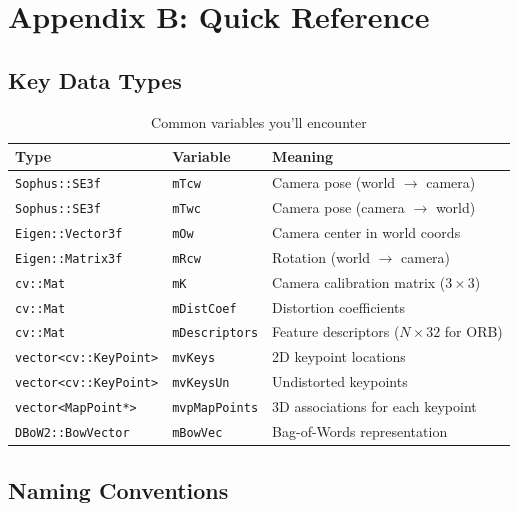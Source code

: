 \section{Appendix B: Quick Reference}

\subsection{Key Data Types}

\begin{table}[H]
\centering
\begin{tabular}{@{}llp{7cm}@{}}
\toprule
\textbf{Type} & \textbf{Variable} & \textbf{Meaning} \\
\midrule
\texttt{Sophus::SE3f} & \texttt{mTcw} & Camera pose (world $\to$ camera) \\
\texttt{Sophus::SE3f} & \texttt{mTwc} & Camera pose (camera $\to$ world) \\
\texttt{Eigen::Vector3f} & \texttt{mOw} & Camera center in world coords \\
\texttt{Eigen::Matrix3f} & \texttt{mRcw} & Rotation (world $\to$ camera) \\
\texttt{cv::Mat} & \texttt{mK} & Camera calibration matrix ($3\times3$) \\
\texttt{cv::Mat} & \texttt{mDistCoef} & Distortion coefficients \\
\texttt{cv::Mat} & \texttt{mDescriptors} & Feature descriptors ($N\times32$ for ORB) \\
\texttt{vector<cv::KeyPoint>} & \texttt{mvKeys} & 2D keypoint locations \\
\texttt{vector<cv::KeyPoint>} & \texttt{mvKeysUn} & Undistorted keypoints \\
\texttt{vector<MapPoint*>} & \texttt{mvpMapPoints} & 3D associations for each keypoint \\
\texttt{DBoW2::BowVector} & \texttt{mBowVec} & Bag-of-Words representation \\
\bottomrule
\end{tabular}
\caption{Common variables you'll encounter}
\end{table}

\subsection{Naming Conventions}

